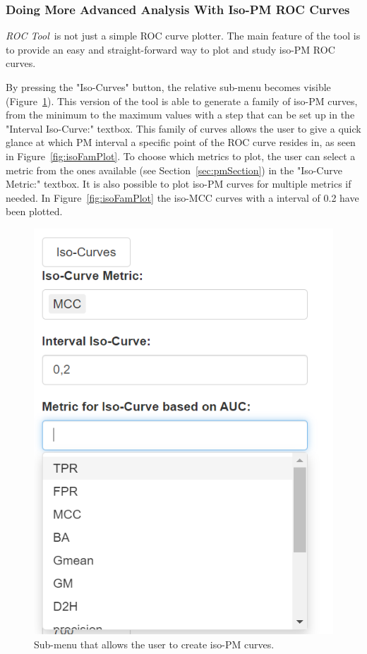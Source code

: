 \documentclass{article}
\newcommand{\toolnameITB}{\textit{ROC Tool}~}
\begin{document}
	 \subsubsection{Doing More Advanced Analysis With Iso-PM ROC Curves} 	 
	 \toolnameITB is not just a simple ROC curve plotter. The main feature of the tool is to provide an easy and straight-forward way to plot and study iso-PM ROC curves.
	 
	 By pressing the "Iso-Curves" button, the relative sub-menu becomes visible (Figure~\ref{fig:isoSubMenu}). This version of the tool is able to generate a family of iso-PM curves, from the minimum to the maximum values with a step that can be set up in the "Interval Iso-Curve:" textbox. This family of curves allows the user to give a quick glance at which PM interval a specific point of the ROC curve resides in, as seen in Figure~\ref{fig:isoFamPlot}. To choose which metrics to plot, the user can select a metric from the ones available (see Section~\ref{sec:pmSection}) in the "Iso-Curve Metric:" textbox. It is also possible to plot iso-PM curves for multiple metrics if needed. In Figure~\ref{fig:isoFamPlot} the iso-MCC curves with a interval of 0.2 have been plotted.
	 
	 \begin{figure}[h!]
	 	\centering
	 	\caption{Sub-menu that allows the user to create iso-PM curves.}
	 	\label{fig:isoSubMenu}
	 	\includegraphics[width=1\linewidth]{Figures/iso_curves_submenu.png}
	 \end{figure}
	 
\end{document}
